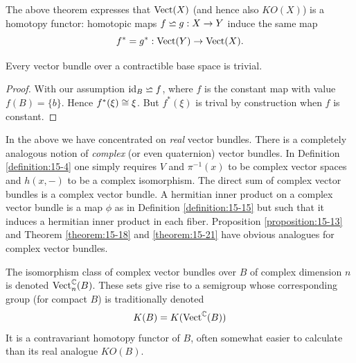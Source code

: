 The above theorem expresses that $\mathrm{Vect}(X)$ (and hence also $KO(X)$) is a homotopy 
functor: homotopic maps $f\backsimeq g: X\to Y$ induce the same map
\[
  f^*=g^*:\mathrm{Vect}(Y)\to \mathrm{Vect}(X).
\]

\begin{corollary}\label{corollary:15-22}
  Every vector bundle over a contractible base space is trivial.
\end{corollary}

\begin{proof}
  With our assumption $\operatorname{id}_B \backsimeq f$, where $f$ is the constant map with value $f(B)=\{b\}$.
  Hence $f^*(\xi)\cong \xi$. But $f^*(\xi)$ is trival by construction when $f$ is constant.
\end{proof}


In the above we have concentrated on \textit{real} vector bundles. There is a completely
analogous notion of \textit{complex} (or even quaternion) vector bundles. In Definition
\ref{definition:15-4} one simply requires $V$ and $\pi^{-1}(x)$ to be complex vector spaces and $h(x, -)$
to be a complex isomorphism. The direct sum of complex vector bundles is a
complex vector bundle. A hermitian inner product on a complex vector bundle is
a map $\phi$ as in Definition \ref{definition:15-15} but such that it induces a hermitian inner product
in each fiber. Proposition \ref{proposition:15-13} and Theorem \ref{theorem:15-18} and \ref{theorem:15-21} have obvious
analogues for complex vector bundles.


The isomorphism class of complex vector bundles over $B$ of complex dimension $n$ is 
denoted $\mathrm{Vect}_n^{\mathbb{C}}(B)$. These sets give rise to a semigroup whose corresponding 
group (for compact $B$) is traditionally denoted
\[
  K(B) = K(\mathrm{Vect}^{\mathbb{C}}(B))
\]
It is a contravariant homotopy functor of $B$, often somewhat easier to calculate
than its real analogue $KO(B)$.